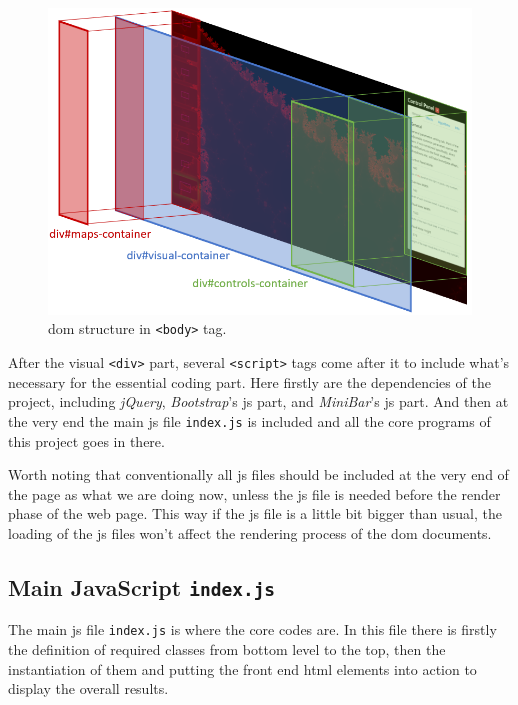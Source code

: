 \begin{figure}[th]
\centering
\includegraphics[width=\textwidth,keepaspectratio]{Figures/Chapter4/rootdom.png}
\decoRule
\caption[DOM Body Structure]{\gls{dom} structure in \texttt{<body>} tag.}
\label{fig:rootdom}
\end{figure}

After the visual \texttt{<div>} part, several \texttt{<script>} tags come after it to include what's necessary for the essential coding part. Here firstly are the dependencies of the project, including \emph{jQuery}, \emph{Bootstrap}'s \gls{js} part, and \emph{MiniBar}'s \gls{js} part. And then at the very end the main \gls{js} file \texttt{index.js} is included and all the core programs of this project goes in there.

Worth noting that conventionally all \gls{js} files should be included at the very end of the page as what we are doing now, unless the \gls{js} file is needed before the render phase of the web page. This way if the \gls{js} file is a little bit bigger than usual, the loading of the \gls{js} files won't affect the rendering process of the \gls{dom} documents.


\subsection{Main JavaScript \texttt{index.js}}

The main \gls{js} file \texttt{index.js} is where the core codes are. In this file there is firstly the definition of required classes from bottom level to the top, then the instantiation of them and putting the front end \gls{html} elements into action to display the overall results.

